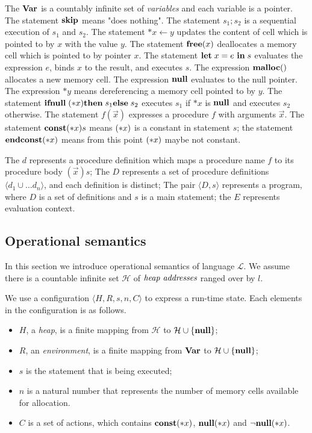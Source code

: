 The \(\mathbf{Var}\) is a countably infinite set of \emph{variables} and each
variable is a pointer. The statement \(\mathbf{skip}\) means "does nothing".
The statement \(s_1;s_2\) is a sequential execution of \(s_1\) and
\(s_2\). The statement \(*x \leftarrow y\) updates the content of cell
which is pointed to by \(x\) with the value \(y\). The statement
\(\mathbf{free}(x)\) deallocates a memory cell which is pointed to by pointer
\(x\). The statement \(\mathbf{let}\; x = e\ \mathbf{in}\; s\) evaluates the expression
\(e\), binds \(x\) to the result, and executes \(s\). The expression
\(\mathbf{malloc}()\) allocates a new memory cell. The expression \(\mathbf{null}\)
evaluates to the null pointer. The expression \(*y\) means
dereferencing a memory cell pointed to by \(y\). The statement
\(\mathbf{ifnull}\;(*x) \mathbf{then}\; s_1 \mathbf{else}\; s_2\) executes \(s_1\) if \(*x\) is
\(\mathbf{null}\) and executes \(s_2\) otherwise. The statement \(f(\vec{x})\)
expresses a procedure \(f\) with arguments \(\vec{x}\). The statement
\(\mathbf{const}(*x) s\) means \((*x)\) is a constant in statement \(s\); the
statement \(\mathbf{endconst}(*x)\) means from this point \((*x)\) maybe not
constant.

The \(d\) represents a procedure definition which maps a procedure
name \(f\) to its procedure body \((\vec{x})s\); The \(D\) represents
a set of procedure definitions \(\langle d_1 \cup\dots d_n \rangle\),
and each definition is distinct; The pair \(\langle D, s \rangle \)
represents a program, where \(D\) is a set of definitions and \(s\) is
a main statement; the \(E\) represents evaluation context.

\subsection{Operational semantics}
\label{sec:languageSemantics}
In this section we introduce operational semantics of language
\(\mathcal{L}\). We assume there is a countable infinite set
\(\mathcal{H}\) of \(\emph{heap addresses}\) ranged over by \(l\).

We use a configuration \(\langle H, R, s, n, C \rangle\) to
express a run-time state. Each elements in the configuration is as
follows.

\begin{itemize}
\item \(H\), a \emph{heap}, is a finite mapping from \(\mathcal{H}\)
  to \(\mathcal{H} \cup \{\mathbf{null}\}\);
\item \(R\), an \emph{environment}, is a finite mapping from \(\mathbf{Var}\)
  to \(\mathcal{H} \cup \{\mathbf{null}\}\);
\item \(s\) is the statement that is being executed; 
\item \(n\) is a natural number that represents the number of memory
  cells available for allocation.
\item \(C\) is a set of actions, which contains \(\mathbf{const}(*x)\),
  \({\bf null}(*x)\) and \(\neg{\bf null}(*x)\).
\end{itemize}

